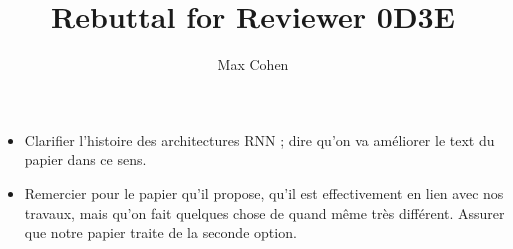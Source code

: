\documentclass{article}
\title{Rebuttal for Reviewer 0D3E}
\author{Max Cohen}
\affil{Samovar, T\'el\'ecom SudParis, CITI, TIPIC, Institut Polyechnique de Paris}
\date{}
\begin{document}
\maketitle

\begin{itemize}
	\item Clarifier l'histoire des architectures RNN ; dire qu'on va améliorer le text du papier dans ce sens.
	\item Remercier pour le papier qu'il propose, qu'il est effectivement en lien avec nos travaux, mais qu'on fait quelques chose de quand même très différent. Assurer que notre papier traite de la seconde option.
\end{itemize}




\end{document}
